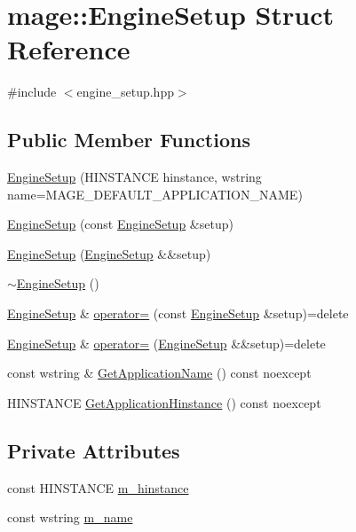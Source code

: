 \hypertarget{structmage_1_1_engine_setup}{}\section{mage\+:\+:Engine\+Setup Struct Reference}
\label{structmage_1_1_engine_setup}


{\ttfamily \#include $<$engine\+\_\+setup.\+hpp$>$}

\subsection*{Public Member Functions}
\begin{DoxyCompactItemize}
\item 
\hyperlink{structmage_1_1_engine_setup_ac3ed7aa532ce0547a1a351c2d5399866}{Engine\+Setup} (H\+I\+N\+S\+T\+A\+N\+CE hinstance, wstring name=M\+A\+G\+E\+\_\+\+D\+E\+F\+A\+U\+L\+T\+\_\+\+A\+P\+P\+L\+I\+C\+A\+T\+I\+O\+N\+\_\+\+N\+A\+ME)
\item 
\hyperlink{structmage_1_1_engine_setup_a2399c7966ed02ce9e9ab951b7483aac1}{Engine\+Setup} (const \hyperlink{structmage_1_1_engine_setup}{Engine\+Setup} \&setup)
\item 
\hyperlink{structmage_1_1_engine_setup_ac199c03ba1968ca0a98a2de48cfb952d}{Engine\+Setup} (\hyperlink{structmage_1_1_engine_setup}{Engine\+Setup} \&\&setup)
\item 
\hyperlink{structmage_1_1_engine_setup_ac9ec3df257c585930b21b2b69c99c177}{$\sim$\+Engine\+Setup} ()
\item 
\hyperlink{structmage_1_1_engine_setup}{Engine\+Setup} \& \hyperlink{structmage_1_1_engine_setup_ad7066882519b59ca533293f743334508}{operator=} (const \hyperlink{structmage_1_1_engine_setup}{Engine\+Setup} \&setup)=delete
\item 
\hyperlink{structmage_1_1_engine_setup}{Engine\+Setup} \& \hyperlink{structmage_1_1_engine_setup_a9ca25ff88af30786022964916790a497}{operator=} (\hyperlink{structmage_1_1_engine_setup}{Engine\+Setup} \&\&setup)=delete
\item 
const wstring \& \hyperlink{structmage_1_1_engine_setup_ab79015dba68069256ed42595b30a5728}{Get\+Application\+Name} () const noexcept
\item 
H\+I\+N\+S\+T\+A\+N\+CE \hyperlink{structmage_1_1_engine_setup_a2d6377386d47058252d77d168d5e60ec}{Get\+Application\+Hinstance} () const noexcept
\end{DoxyCompactItemize}
\subsection*{Private Attributes}
\begin{DoxyCompactItemize}
\item 
const H\+I\+N\+S\+T\+A\+N\+CE \hyperlink{structmage_1_1_engine_setup_a678360078479bc3fee6bed4617caebbf}{m\+\_\+hinstance}
\item 
const wstring \hyperlink{structmage_1_1_engine_setup_a40fba981d4b1c30eff304b029a013009}{m\+\_\+name}
\end{DoxyCompactItemize}


